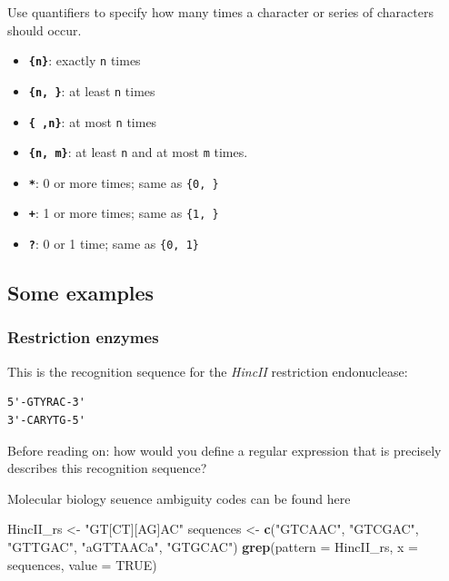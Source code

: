 \documentclass[]{book}
\newenvironment{Shaded}{\begin{snugshade}}{\end{snugshade}}
\newcommand{\DataTypeTok}[1]{\textcolor[rgb]{0.13,0.29,0.53}{#1}}
\newcommand{\KeywordTok}[1]{\textcolor[rgb]{0.13,0.29,0.53}{\textbf{#1}}}
\newcommand{\NormalTok}[1]{#1}
\newcommand{\OtherTok}[1]{\textcolor[rgb]{0.56,0.35,0.01}{#1}}
\newcommand{\StringTok}[1]{\textcolor[rgb]{0.31,0.60,0.02}{#1}}
\providecommand{\tightlist}{%
  \setlength{\itemsep}{0pt}\setlength{\parskip}{0pt}}
\begin{document}
Use quantifiers to specify how many times a character or series of characters should occur.

\begin{itemize}
\tightlist
\item
  \textbf{\texttt{\{n\}}}: exactly \texttt{n} times
\item
  \textbf{\texttt{\{n,\ \}}}: at least \texttt{n} times
\item
  \textbf{\texttt{\{\ ,n\}}}: at most \texttt{n} times
\item
  \textbf{\texttt{\{n,\ m\}}}: at least \texttt{n} and at most \texttt{m} times.
\item
  \textbf{\texttt{*}}: 0 or more times; same as \texttt{\{0,\ \}}
\item
  \textbf{\texttt{+}}: 1 or more times; same as \texttt{\{1,\ \}}
\item
  \textbf{\texttt{?}}: 0 or 1 time; same as \texttt{\{0,\ 1\}}
\end{itemize}

\hypertarget{some-examples}{%
\subsection{Some examples}\label{some-examples}}

\hypertarget{restriction-enzymes}{%
\subsubsection*{Restriction enzymes}\label{restriction-enzymes}}

This is the recognition sequence for the \emph{HincII} restriction endonuclease:

\begin{verbatim}
5'-GTYRAC-3'
3'-CARYTG-5'
\end{verbatim}

Before reading on: how would you define a regular expression that is precisely describes this recognition sequence?

Molecular biology seuence ambiguity codes can be found
here

\begin{Shaded}
\begin{Highlighting}[]
\NormalTok{HincII_rs <-}\StringTok{ "GT[CT][AG]AC"}
\NormalTok{sequences <-}\StringTok{ }\KeywordTok{c}\NormalTok{(}\StringTok{"GTCAAC"}\NormalTok{,}
               \StringTok{"GTCGAC"}\NormalTok{,}
               \StringTok{"GTTGAC"}\NormalTok{,}
               \StringTok{"aGTTAACa"}\NormalTok{,}
               \StringTok{"GTGCAC"}\NormalTok{)}
\KeywordTok{grep}\NormalTok{(}\DataTypeTok{pattern =}\NormalTok{ HincII_rs, }\DataTypeTok{x =}\NormalTok{ sequences, }\DataTypeTok{value =} \OtherTok{TRUE}\NormalTok{)}
\end{Highlighting}
\end{Shaded}
\end{document}
